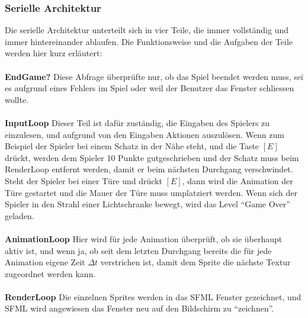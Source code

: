\documentclass[12pt,a4paper]{scrartcl}
\newcommand{\q}[1]{``#1''}
\begin{document}
\subsubsection{Serielle Architektur}
Die serielle Architektur unterteilt sich in vier Teile, die immer vollständig und immer hintereinander ablaufen. Die Funktionsweise
und die Aufgaben der Teile werden hier kurz erläutert:\\
\\
\textbf{EndGame?}
Diese Abfrage überprüfte nur, ob das Spiel beendet werden muss, sei es aufgrund eines Fehlers im Spiel
oder weil der Benutzer das Fenster schliessen wollte.\\
\\
\textbf{InputLoop}
Dieser Teil ist dafür zuständig, die Eingaben des Spielers zu einzulesen, und aufgrund von den Eingaben Aktionen auszulösen. Wenn zum Beispiel
der Spieler bei einem Schatz in der Nähe steht, und die Taste $[E]$ drückt, werden dem Spieler 10 Punkte gutgeschrieben und der Schatz muss beim
RenderLoop entfernt werden, damit er beim nächsten Durchgang verschwindet. Steht der Spieler bei einer Türe und drückt $[E]$, dann wird die Animation
der Türe gestartet und die Mauer der Türe muss umplatziert werden. Wenn sich der Spieler in den Strahl einer Lichtschranke bewegt, wird das Level
\q{Game Over} geladen.\\
\\
\textbf{AnimationLoop}
Hier wird für jede Animation überprüft, ob sie überhaupt aktiv ist, und wenn ja, ob seit dem letzten Durchgang bereits die für jede Animation
eigene Zeit $\Delta t$ verstrichen ist, damit dem Sprite die nächste Textur zugeordnet werden kann.\\
\\
\textbf{RenderLoop}
Die einzelnen Sprites werden in das SFML Fenster gezeichnet, und SFML wird angewiesen das Fenster neu auf den Bildschirm zu \q{zeichnen}.
\end{document}

